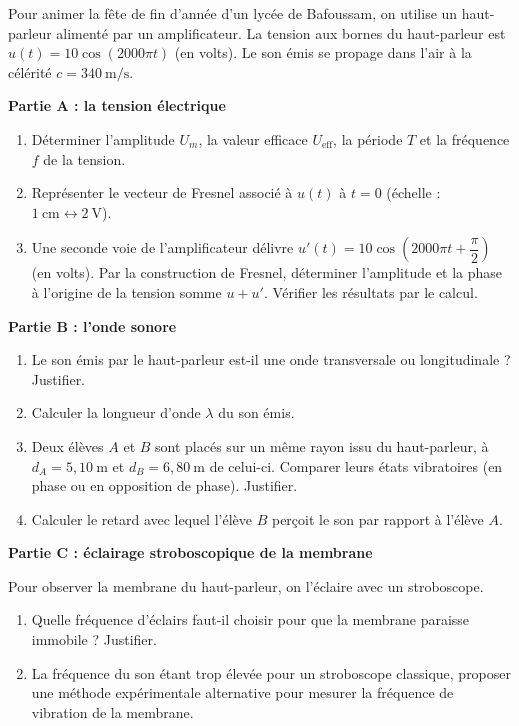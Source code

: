 \documentclass[11pt]{article}
\begin{document}
\begin{exercice}
Pour animer la fête de fin d'année d'un lycée de Bafoussam, on utilise un haut-parleur alimenté par un amplificateur. La tension aux bornes du haut-parleur est $u(t) = 10\cos(2000\pi t)$ (en volts). Le son émis se propage dans l'air à la célérité $c = 340\ \text{m/s}$.

\textbf{Partie A : la tension électrique}
\begin{enumerate}
\item Déterminer l'amplitude $U_m$, la valeur efficace $U_{\text{eff}}$, la période $T$ et la fréquence $f$ de la tension.
\item Représenter le vecteur de Fresnel associé à $u(t)$ à $t = 0$ (échelle : $1\ \text{cm} \leftrightarrow 2\ \text{V}$).
\item Une seconde voie de l'amplificateur délivre $u'(t) = 10\cos\left(2000\pi t + \dfrac{\pi}{2}\right)$ (en volts). Par la construction de Fresnel, déterminer l'amplitude et la phase à l'origine de la tension somme $u + u'$. Vérifier les résultats par le calcul.
\end{enumerate}

\textbf{Partie B : l'onde sonore}
\begin{enumerate}[resume]
\item Le son émis par le haut-parleur est-il une onde transversale ou longitudinale ? Justifier.
\item Calculer la longueur d'onde $\lambda$ du son émis.
\item Deux élèves $A$ et $B$ sont placés sur un même rayon issu du haut-parleur, à $d_A = 5{,}10\ \text{m}$ et $d_B = 6{,}80\ \text{m}$ de celui-ci. Comparer leurs états vibratoires (en phase ou en opposition de phase). Justifier.
\item Calculer le retard avec lequel l'élève $B$ perçoit le son par rapport à l'élève $A$.
\end{enumerate}

\textbf{Partie C : éclairage stroboscopique de la membrane}

Pour observer la membrane du haut-parleur, on l'éclaire avec un stroboscope.
\begin{enumerate}[resume]
\item Quelle fréquence d'éclairs faut-il choisir pour que la membrane paraisse immobile ? Justifier.
\item La fréquence du son étant trop élevée pour un stroboscope classique, proposer une méthode expérimentale alternative pour mesurer la fréquence de vibration de la membrane.
\end{enumerate}
\end{exercice}
\end{document}
